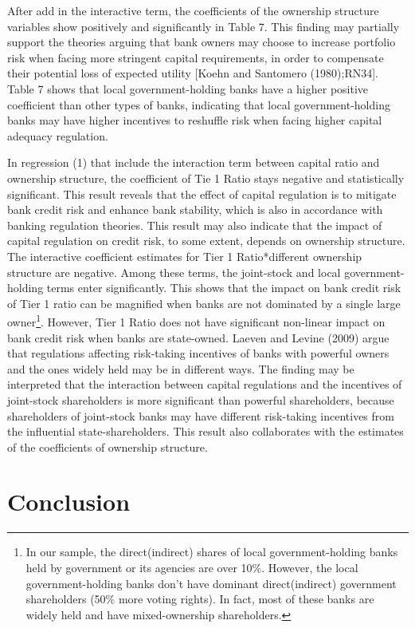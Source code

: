 \documentclass{article}
\begin{document}
After add in the interactive term, the coefficients of the ownership
structure variables show positively and significantly in Table 7. This
finding may partially support the theories arguing that bank owners may
choose to increase portfolio risk when facing more stringent capital
requirements, in order to compensate their potential loss of expected
utility {[}Koehn and Santomero (1980);RN34{]}. Table 7 shows that local
government-holding banks have a higher positive coefficient than other
types of banks, indicating that local government-holding banks may have
higher incentives to reshuffle risk when facing higher capital adequacy
regulation.

In regression (1) that include the interaction term between capital
ratio and ownership structure, the coefficient of Tie 1 Ratio stays
negative and statistically significant. This result reveals that the
effect of capital regulation is to mitigate bank credit risk and enhance
bank stability, which is also in accordance with banking regulation
theories. This result may also indicate that the impact of capital
regulation on credit risk, to some extent, depends on ownership
structure. The interactive coefficient estimates for Tier 1
Ratio*different ownership structure are negative. Among these terms, the
joint-stock and local government-holding terms enter significantly. This
shows that the impact on bank credit risk of Tier 1 ratio can be
magnified when banks are not dominated by a single large owner\footnote{In
  our sample, the direct(indirect) shares of local government-holding
  banks held by government or its agencies are over 10\%. However, the
  local government-holding banks don't have dominant direct(indirect)
  government shareholders (50\% more voting rights). In fact, most of
  these banks are widely held and have mixed-ownership shareholders.}.
However, Tier 1 Ratio does not have significant non-linear impact on
bank credit risk when banks are state-owned. Laeven and Levine (2009)
argue that regulations affecting risk-taking incentives of banks with
powerful owners and the ones widely held may be in different ways. The
finding may be interpreted that the interaction between capital
regulations and the incentives of joint-stock shareholders is more
significant than powerful shareholders, because shareholders of
joint-stock banks may have different risk-taking incentives from the
influential state-shareholders. This result also collaborates with the
estimates of the coefficients of ownership structure.

\hypertarget{conclusion}{%
\section{Conclusion}\label{conclusion}}
\end{document}
